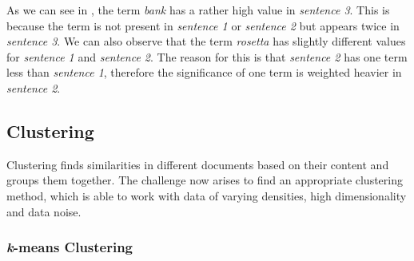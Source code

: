 \begin{table}[h]
    \centering
    \caption{tf-idf \Gls{vsm}.}
    \label{tab:tfidf_vsm}
\end{table}

As we can see in , the term \textit{bank} has a rather high value in \textit{sentence 3}.
This is because the term is not present in \textit{sentence 1} or \textit{sentence 2} but appears
twice in \textit{sentence 3}.
We can also observe that the term \textit{rosetta} has slightly different values for
\textit{sentence 1} and \textit{sentence 2}.
The reason for this is that \textit{sentence 2} has one term less than \textit{sentence 1},
therefore the significance of one term is weighted heavier in \textit{sentence 2}.

\subsection{Clustering}
\label{subsec:3_clustering}

Clustering finds similarities in different documents based on their content and groups them together.
The challenge now arises to find an appropriate clustering method,
which is able to work with data of varying densities, high dimensionality and data noise.

\subsubsection{\textit{k}-means Clustering}
\label{subsubsec:3_kmeans_clustering}

